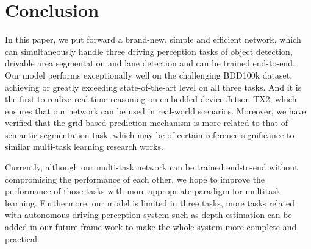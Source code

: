 \documentclass[10pt,twocolumn,letterpaper]{article}
\begin{document}
\begin{table*}
\renewcommand\arraystretch{1.1}
\begin{center}
\end{center}
\caption{Panoptic driving perception results: Grid-based v.s. Region-based.}
\label{table:GVR}
\end{table*}

\section{Conclusion}
In this paper, we put forward a brand-new, simple and efficient network, which can simultaneously handle three driving perception tasks of object detection, drivable area segmentation and lane detection and can be trained end-to-end. Our model performs exceptionally well on the challenging BDD100k dataset, achieving or greatly exceeding state-of-the-art level on all three tasks. And it is the first to realize real-time reasoning on embedded device Jetson TX2, which ensures that our network can be used in real-world scenarios. Moreover, we have verified that the grid-based prediction mechanism is more related to that of semantic segmentation task. which may be of certain reference significance to similar multi-task learning research works.

Currently, although our multi-task network can be trained end-to-end without compromising the performance of each other, we hope to improve the performance of those tasks with more appropriate paradigm for multitask learning. Furthermore, our model is limited in three tasks, more tasks related with autonomous driving perception system such as depth estimation can be added in our future frame work to make the whole system more complete and practical.


{\small


}
\end{document}
